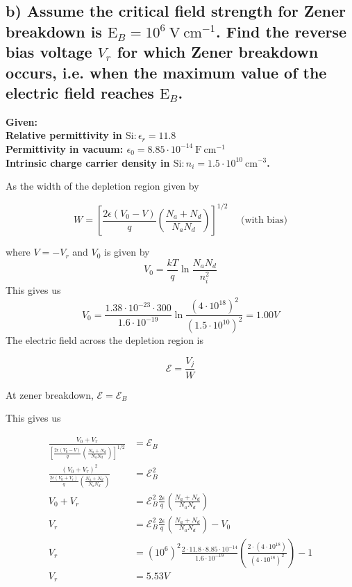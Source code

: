 \subsection*{b) Assume the critical field strength for Zener breakdown is $\mathrm{E}_B=10^6 \mathrm{~V} \mathrm{~cm}^{-1}$. Find the reverse bias voltage $V_r$ for which Zener breakdown occurs, i.e. when the maximum value of the electric field reaches $\mathrm{E}_B$.}
\textbf{Given:\\
Relative permittivity in $\mathrm{Si}: \epsilon_r=11.8$\\
Permittivity in vacuum: $\epsilon_0=8.85 \cdot 10^{-14} \mathrm{~F} \mathrm{~cm}^{-1}$\\
Intrinsic charge carrier density in $\mathrm{Si}: n_i=1.5 \cdot 10^{10} \mathrm{~cm}^{-3}$.}

As the width of the depletion region given by 

$$
W=\left[\frac{2 \epsilon\left(V_0-V\right)}{q}\left(\frac{N_a+N_d}{N_a N_d}\right)\right]^{1 / 2} \quad \text { (with bias)}
$$

where $V=-V_r$ and $V_0$ is given by 
$$
V_0=\frac{k T}{q} \ln \frac{N_a N_d}{n_i^2}
$$
This gives us
$$
V_0=\frac{1.38 \cdot 10^{-23} \cdot300}{1.6\cdot 10^{-19}} \ln \frac{\left(4\cdot10^{18}\right)^2}{\left(1.5 \cdot 10^{10}\right)^2}= 1.00V
$$
The electric field across the depletion region is 

$$
\mathscr{E}=\frac{V_j}{W}
$$

At zener breakdown, $\mathscr{E}=\mathscr{E}_B$

This gives us 

\begin{align*}
    \frac{V_0+V_r}{\left[\frac{2 \epsilon\left(V_0-V\right)}{q}\left(\frac{N_a+N_d}{N_a N_d}\right)\right]^{1 / 2} }&=\mathscr{E}_B\\
    \frac{\left(V_0+V_r\right)^2}{\frac{2 \epsilon\left(V_0+V_r\right)}{q}\left(\frac{N_a+N_d}{N_a N_d}\right) }&=\mathscr{E}_B^2\\
    V_0+V_r&=\mathscr{E}_B^2\frac{2 \epsilon}{q}\left(\frac{N_a+N_d}{N_a N_d}\right)\\
    V_r&=\mathscr{E}_B^2\frac{2 \epsilon}{q}\left(\frac{N_a+N_d}{N_a N_d}\right) -V_0\\
    V_r&=\left(10^6\right)^2\frac{2 \cdot 11.8\cdot 8.85 \cdot 10^{-14}}{1.6\cdot 10^{-19}}\left(\frac{2\cdot\left(4 \cdot 10^{18}\right)}{\left(4 \cdot 10^{18}\right)^2}\right) -1\\
    V_r&=5.53V
\end{align*}



